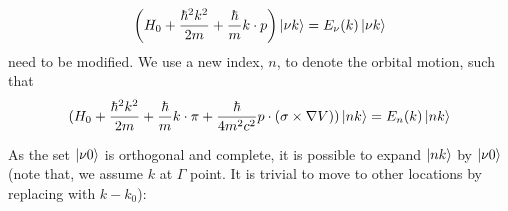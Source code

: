 \documentclass{article}
\begin{document}
\begin{equation}
    \left( H_0 + \frac{\hbar^2 k^2}{2 m} + \frac{\hbar}{m} k \cdot p \right) \ket{\nu k} = E_{\nu} (k) \ket{\nu k}
\end{equation}
need to be modified. We use a new index, $n$, to denote the orbital motion, such that
\begin{equation}
    (H_0 + \frac{\hbar^2 k^2}{2 m} + \frac{\hbar}{m} k \cdot \pi + \frac{\hbar}{4 m^2 c^2} p \cdot (\sigma \times \nabla V))\ket{nk}=E_n(k)\ket{nk}
\end{equation}

As the set $\ket{\nu 0}$ is orthogonal and complete, it is possible to expand $\ket{nk}$ by $\ket{\nu 0}$ (note that, we assume $k$ at $\Gamma$ point. It is trivial to move to other locations by replacing with $k-k_0$):
\end{document}
